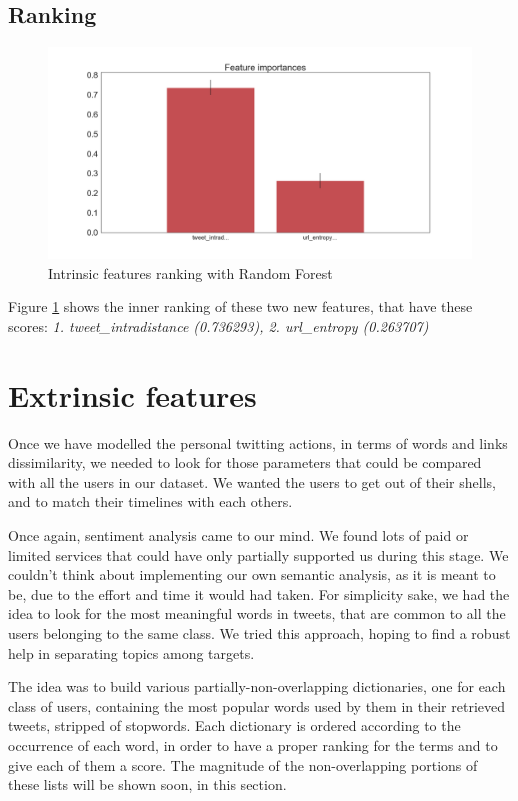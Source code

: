\subsection{Ranking}
\begin{figure}[htp!]
	\centering
	\includegraphics[width=\columnwidth]{chapter4/figure/intrinsic_features_importances.png}
	\caption{Intrinsic features ranking with Random Forest}
	\label{fig:intr_rank}
\end{figure}
Figure \ref{fig:intr_rank} shows the inner ranking of these two new features, that have these scores:
\textit{1. tweet\_intradistance (0.736293), 2. url\_entropy (0.263707)}
\section{Extrinsic features}
Once we have modelled the personal twitting actions, in terms of words and links dissimilarity, we needed to look for those parameters that could be compared with all the users in our dataset.
We wanted the users to get out of their shells, and to match their timelines with each others.

Once again, sentiment analysis came to our mind. We found lots of paid or limited services that could have only partially supported us during this stage.
We couldn't think about implementing our own semantic analysis, as it is meant to be, due to the effort and time it would had taken.
For simplicity sake, we had the idea to look for the most meaningful words in tweets, that are common to all the users belonging to the same class.
We tried this approach, hoping to find a robust help in separating topics among targets.

The idea was to build various partially-non-overlapping dictionaries, one for each class of users, containing the most popular words used by them in their retrieved tweets, stripped of stopwords. Each dictionary is ordered according to the occurrence of each word, in order to have a proper ranking for the terms and to give each of them a score.
The magnitude of the non-overlapping portions of these lists will be shown soon, in this section.

